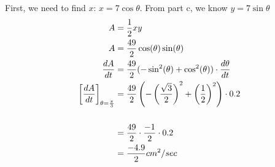 \documentclass[nooutcomes]{ximera}
\begin{document}
\begin{problem}
\begin{enumerate}
		\begin{freeResponse}
		First, we need to find $x$: $x=7 \cos{\theta}$.  From part c, we know $y=7\sin{\theta}$
		\begin{align*}
		A&=\frac{1}{2}xy\\
		A&=\frac{49}{2}\cos(\theta)\sin(\theta)\\
		\frac{dA}{dt}&=\frac{49}{2}(-\sin^2(\theta)+\cos^2(\theta)) \cdot \frac{d\theta}{dt}\\
		\bigg[ \frac{dA}{dt} \bigg]_{\theta=\frac{\pi}{3}}&=\frac{49}{2}\left(-\left(\frac{\sqrt{3}}{2}\right)^2+\left(\frac{1}{2}\right)^2 \right) \cdot 0.2\\\\
		&=\frac{49}{2}\cdot \frac{-1}{2} \cdot 0.2\\
		&=\frac{-4.9}{2} cm^2/sec
		\end{align*}
		\end{freeResponse}
\end{enumerate}
\end{problem}
\end{document}
